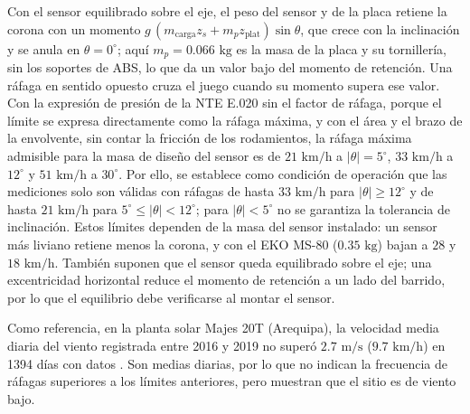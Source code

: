 \documentclass[../../General.tex]{subfiles}
\begin{document}
Con el sensor equilibrado sobre el eje, el peso del sensor y de la placa retiene la corona con un momento $g\,(m_{\text{carga}} z_s + m_{p} z_{\text{plat}})\sin\theta$, que crece con la inclinación y se anula en $\theta = 0^\circ$; aquí $m_p = 0.066\text{ kg}$ es la masa de la placa y su tornillería, sin los soportes de ABS, lo que da un valor bajo del momento de retención. Una ráfaga en sentido opuesto cruza el juego cuando su momento supera ese valor. Con la expresión de presión de la NTE E.020 sin el factor de ráfaga, porque el límite se expresa directamente como la ráfaga máxima, y con el área y el brazo de la envolvente, sin contar la fricción de los rodamientos, la ráfaga máxima admisible para la masa de diseño del sensor es de $21\text{ km/h}$ a $|\theta| = 5^\circ$, $33\text{ km/h}$ a $12^\circ$ y $51\text{ km/h}$ a $30^\circ$. Por ello, se establece como condición de operación que las mediciones solo son válidas con ráfagas de hasta $33\text{ km/h}$ para $|\theta| \geq 12^\circ$ y de hasta $21\text{ km/h}$ para $5^\circ \leq |\theta| < 12^\circ$; para $|\theta| < 5^\circ$ no se garantiza la tolerancia de inclinación. Estos límites dependen de la masa del sensor instalado: un sensor más liviano retiene menos la corona, y con el EKO MS-80 ($0.35\text{ kg}$) bajan a $28$ y $18\text{ km/h}$. También suponen que el sensor queda equilibrado sobre el eje; una excentricidad horizontal reduce el momento de retención a un lado del barrido, por lo que el equilibrio debe verificarse al montar el sensor.

Como referencia, en la planta solar Majes 20T (Arequipa), la velocidad media diaria del viento registrada entre 2016 y 2019 no superó $2.7\text{ m/s}$ ($9.7\text{ km/h}$) en 1394 días con datos \citep{gts_majes_2020}. Son medias diarias, por lo que no indican la frecuencia de ráfagas superiores a los límites anteriores, pero muestran que el sitio es de viento bajo.
\end{document}
